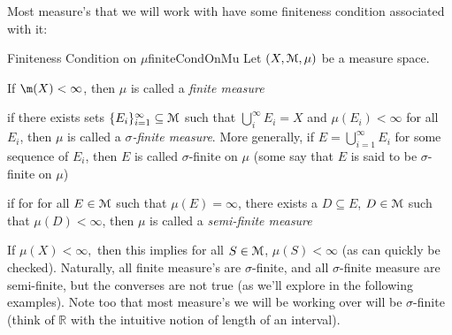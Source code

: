 \documentclass[oneside]{book}
\newcommand{\R}{\mathbb{R}}
\newcommand{\MM}{\EuScript{M}}
\newcommand{\EM}{\EuScript{M}}
\newcommand{\sse}{\subseteq}
\begin{document}
Most measure's that we will work with have some finiteness condition associated with it:
\begin{defn}{Finiteness Condition on $\mu$}{finiteCondOnMu}
	Let $(X, \EM, \mu)$ be a measure space.
	\begin{enuemrate}
		\item If $\m(X) < \infty$, then $\mu$ is called a \emph{finite measure}
		\item if there exists sets $\{E_i\}_{i=1}^\infty \sse \EM$ such that $\bigcup_i^\infty E_i = X$ and $\mu(E_i)
			< \infty$ for all $E_i$, then $\mu$ is called a \emph{$\sigma$-finite measure}. More generally, if $E
			= \bigcup_{i=1}^\infty E_i$ for some sequence of $E_i$, then $E$ is called $\sigma$-finite on $\mu$ (some
			say that $E$ is said to be $\sigma$-finite on $\mu$)
		\item if for for all $E \in \EM$ such that $\mu(E) = \infty$, there exists a $D \sse E$, $D \in \EM$ such that $\mu(D) < \infty$, then $\mu$ is
			called a \emph{semi-finite measure}
	\end{enuemrate}
\end{defn}
If $\mu(X) < \infty,$ then this implies for all $S \in \MM$, $\mu(S) < \infty$ (as can quickly be checked). Naturally,
all finite measure's are $\sigma$-finite, and all $\sigma$-finite measure are semi-finite, but the converses are not
true (as we'll explore in the following examples). Note too that most measure's we will be working over will be
$\sigma$-finite (think of $\R$ with the intuitive notion of length of an interval). 
\end{document}
